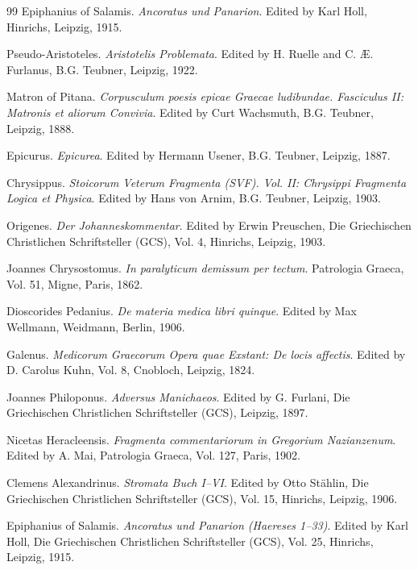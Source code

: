 \documentclass[11pt,twoside,a4paper]{article}
\begin{document}
\begin{thebibliography}{99}
Epiphanius of Salamis. \textit{Ancoratus und Panarion}. Edited by Karl Holl, Hinrichs, Leipzig, 1915.

Pseudo-Aristoteles. \textit{Aristotelis Problemata}. Edited by H. Ruelle and C. \AE{}. Furlanus, B.G. Teubner, Leipzig, 1922.

Matron of Pitana. \textit{Corpusculum poesis epicae Graecae ludibundae. Fasciculus II: Matronis et aliorum Convivia}. Edited by Curt Wachsmuth, B.G. Teubner, Leipzig, 1888.

Epicurus. \textit{Epicurea}. Edited by Hermann Usener, B.G. Teubner, Leipzig, 1887.

Chrysippus. \textit{Stoicorum Veterum Fragmenta (SVF). Vol. II: Chrysippi Fragmenta Logica et Physica}. Edited by Hans von Arnim, B.G. Teubner, Leipzig, 1903.

Origenes. \textit{Der Johanneskommentar}. Edited by Erwin Preuschen, Die Griechischen Christlichen Schriftsteller (GCS), Vol. 4, Hinrichs, Leipzig, 1903.

Joannes Chrysostomus. \textit{In paralyticum demissum per tectum}. Patrologia Graeca, Vol. 51, Migne, Paris, 1862.

Dioscorides Pedanius. \textit{De materia medica libri quinque}. Edited by Max Wellmann, Weidmann, Berlin, 1906.

Galenus. \textit{Medicorum Graecorum Opera quae Exstant: De locis affectis}. Edited by D. Carolus Kuhn, Vol. 8, Cnobloch, Leipzig, 1824.

Joannes Philoponus. \textit{Adversus Manichaeos}. Edited by G. Furlani, Die Griechischen Christlichen Schriftsteller (GCS), Leipzig, 1897.

Nicetas Heracleensis. \textit{Fragmenta commentariorum in Gregorium Nazianzenum}. Edited by A. Mai, Patrologia Graeca, Vol. 127, Paris, 1902.

Clemens Alexandrinus. \textit{Stromata Buch I--VI}. Edited by Otto St\"{a}hlin, Die Griechischen Christlichen Schriftsteller (GCS), Vol. 15, Hinrichs, Leipzig, 1906.

Epiphanius of Salamis. \textit{Ancoratus und Panarion (Haereses 1--33)}. Edited by Karl Holl, Die Griechischen Christlichen Schriftsteller (GCS), Vol. 25, Hinrichs, Leipzig, 1915.

\end{thebibliography}
\end{document}
